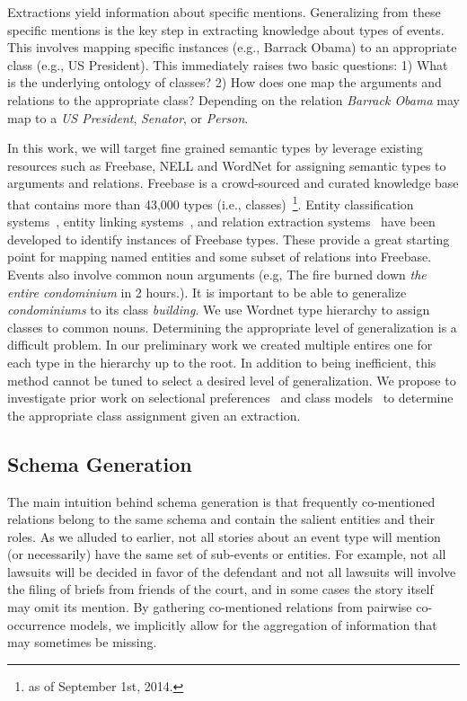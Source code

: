 Extractions yield information about specific mentions. Generalizing from these specific mentions is the key step in extracting knowledge about types of events. This involves mapping specific instances (e.g., Barrack Obama) to an appropriate class (e.g., US President). This immediately raises two basic questions: 1) What is the underlying ontology of classes? 2) How does one map the arguments and relations to the appropriate class? Depending on the relation {\em Barrack Obama} may map to a {\em US President}, {\em Senator}, or {\em Person}.  

In this work, we will target fine grained semantic types by leverage existing resources such as Freebase, NELL and WordNet for assigning semantic types to arguments and relations. Freebase is a crowd-sourced and curated knowledge base that contains more than 43,000 types (i.e., classes)~\footnote{as of September 1st, 2014.}. Entity classification systems~\cite{ling2012fine}, entity linking systems~\cite{lin2012no}, and relation extraction systems~\cite{hoffmann-acl11,hoffmann-acl10} have been developed to identify instances of Freebase types. These provide a great starting 
point for mapping named entities and some subset of relations into Freebase. Events also involve common noun arguments (e.g, The fire burned down {\em the entire condominium} in 2 hours.). It is important to be able to generalize {\em condominiums} to its class {\em building}. We use Wordnet type hierarchy to assign classes to common nouns.
Determining the appropriate level of generalization is a difficult problem. In our preliminary work we created multiple entires one for each type in the hierarchy up to the root. In addition to being inefficient, this method cannot be tuned to select a desired level of generalization. We propose to investigate prior work on selectional preferences~\cite{ritter2010latent} and class models~\cite{clark2000class} to determine the appropriate class assignment given an extraction.
 
 \subsection{Schema Generation}
The main intuition behind schema generation is that frequently co-mentioned relations belong to the same schema and contain the salient entities and their roles.  As we alluded to earlier, not all stories about an event type will mention (or necessarily) have the same set of sub-events or entities. For example, not all lawsuits will be decided in favor of the defendant and not all lawsuits will involve the filing of briefs from friends of the court, and in some cases the story itself may omit its mention. By gathering co-mentioned relations from pairwise co-occurrence models, we implicitly allow for the aggregation of information that may sometimes be missing. 

